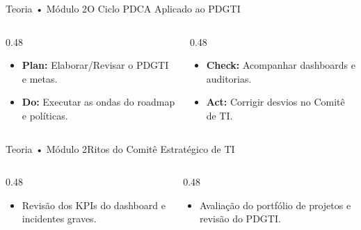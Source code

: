 \begin{senaiframe}{Teoria • Módulo 2}{O Ciclo PDCA Aplicado ao PDGTI}
  \begin{columns}[t]
    \begin{column}{0.48\textwidth}
      \begin{tcolorbox}[senaibluecard, title={Plan \& Do}]
        \begin{itemize}
          \item \textbf{Plan:} Elaborar/Revisar o PDGTI e metas.
          \item \textbf{Do:} Executar as ondas do roadmap e políticas.
        \end{itemize}
      \end{tcolorbox}
    \end{column}
    \begin{column}{0.48\textwidth}
      \begin{tcolorbox}[senaigreencard, title={Check \& Act}]
        \begin{itemize}
          \item \textbf{Check:} Acompanhar dashboards e auditorias.
          \item \textbf{Act:} Corrigir desvios no Comitê de TI.
        \end{itemize}
      \end{tcolorbox}
    \end{column}
  \end{columns}
\end{senaiframe}

\begin{senaiframe}{Teoria • Módulo 2}{Ritos do Comitê Estratégico de TI}
  \begin{columns}[t]
    \begin{column}{0.48\textwidth}
      \begin{tcolorbox}[senaibluecard, title={Pauta Mensal}]
        \begin{itemize}
          \item Revisão dos KPIs do dashboard e incidentes graves.
        \end{itemize}
      \end{tcolorbox}
    \end{column}
    \begin{column}{0.48\textwidth}
      \begin{tcolorbox}[senaiambercard, title={Pauta Trimestral/Anual}]
        \begin{itemize}
          \item Avaliação do portfólio de projetos e revisão do PDGTI.
        \end{itemize}
      \end{tcolorbox}
    \end{column}
  \end{columns}
\end{senaiframe}


